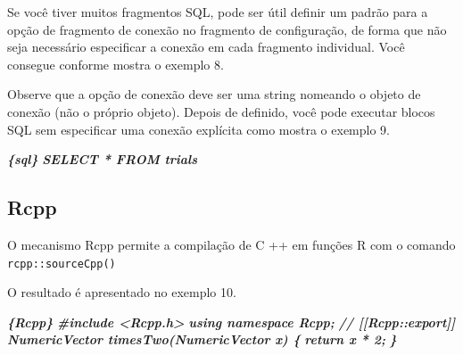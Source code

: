 \documentclass[
]{book}
\newenvironment{Shaded}{\begin{snugshade}}{\end{snugshade}}
\newcommand{\DataTypeTok}[1]{\textcolor[rgb]{0.13,0.29,0.53}{#1}}
\newcommand{\InformationTok}[1]{\textcolor[rgb]{0.56,0.35,0.01}{\textbf{\textit{#1}}}}
\newcommand{\KeywordTok}[1]{\textcolor[rgb]{0.13,0.29,0.53}{\textbf{#1}}}
\newcommand{\NormalTok}[1]{#1}
\newcommand{\OperatorTok}[1]{\textcolor[rgb]{0.81,0.36,0.00}{\textbf{#1}}}
\newcommand{\StringTok}[1]{\textcolor[rgb]{0.31,0.60,0.02}{#1}}
\begin{document}
Se você tiver muitos fragmentos SQL, pode ser útil definir um padrão para a opção de fragmento de conexão no fragmento de configuração, de forma que não seja necessário especificar a conexão em cada fragmento individual. Você consegue conforme mostra o exemplo 8.

\begin{Shaded}
\end{Shaded}

Observe que a opção de conexão deve ser uma string nomeando o objeto de conexão (não o próprio objeto). Depois de definido, você pode executar blocos SQL sem especificar uma conexão explícita como mostra o exemplo 9.

\begin{Shaded}
\begin{Highlighting}[]
 \InformationTok{\textasciigrave{}\textasciigrave{}\textasciigrave{}\{sql\}}
\InformationTok{SELECT * FROM trials}
\InformationTok{\textasciigrave{}\textasciigrave{}\textasciigrave{}}
\end{Highlighting}
\end{Shaded}

\hypertarget{rcpp}{%
\subsection{Rcpp}\label{rcpp}}

O mecanismo Rcpp permite a compilação de C ++ em funções R com o comando \texttt{rcpp::sourceCpp()}

O resultado é apresentado no exemplo 10.

\begin{Shaded}
\begin{Highlighting}[]
 \InformationTok{\textasciigrave{}\textasciigrave{}\textasciigrave{}\{Rcpp\}}
\InformationTok{\#include \textless{}Rcpp.h\textgreater{}}
\InformationTok{using namespace Rcpp;}
\InformationTok{// [[Rcpp::export]]}
\InformationTok{NumericVector timesTwo(NumericVector x) \{}
\InformationTok{return x * 2;}
\InformationTok{\}}
\InformationTok{\textasciigrave{}\textasciigrave{}\textasciigrave{}}
\end{Highlighting}
\end{Shaded}
\end{document}
